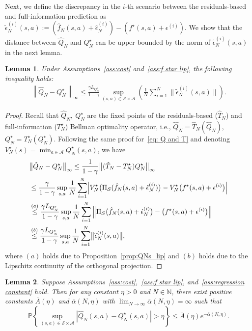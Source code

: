 \documentclass[letterpaper, 10 pt, conference]{ieeeconf}  %
\newtheorem{lemma}{Lemma}
\begin{document}
Next, we define the discrepancy in the $i$-th scenario between the residuals-based and full-information prediction as $\widetilde{\epsilon}_N^{(i)}(s,a):=(\hat f_N(s,a)+\hat\epsilon_N^{(i)}) - (f^\star(s,a) + \epsilon^{(i)})$. We show that the distance between $\hat{Q}_N$ and $Q_N^\star$ can be upper bounded by the norm of $\widetilde{\epsilon}_N^{(i)}(s,a)$ in the next lemma.
\begin{lemma}\label{lemma: hatQ_N - Q_N^*} Under Assumptions\ \ref{ass:cost} and\ \ref{ass:f star lip}, the following inequality holds:
\begin{align}
\left\|\hat{Q}_N - Q_N^\star\right\|_\infty \le \frac{\gamma L_{Q_N^\star}}{1-\gamma}   \sup_{(s,a) \in \mathcal S \times \mathcal A}\left(\frac{1}{N} \sum_{i=1}^N \|\widetilde{\epsilon}_N^{(i)}(s,a)\|\right).
\end{align}
\end{lemma}
\begin{proof}
Recall that $\hat{Q}_N,\ Q^\star_N$ are the fixed points of the residuals-based ($\hat{T}_N$) and full-information ($T^\star_N$) Bellman optimality operator, i.e., $\hat{Q}_N = \hat{T}_N(\hat{Q}_N)$, $Q^\star_N = T_N^\star(Q^\star_N)$. Following the same proof for\ \eqref{eq: Q and T} and denoting $V_N^\star(s)=\min_{a\in\mathcal A}Q_N^\star(s,a)$, we have
\allowdisplaybreaks
\footnotesize
\begin{align}
&\bigl\|\hat{Q}_N-Q_N^\star\bigr\|_\infty
\le \frac{1}{1-\gamma}
\bigl\|(\hat{T}_N-T_N^\star)Q_N^\star\bigr\|_\infty\nonumber\\
&\le \frac{\gamma}{1-\gamma}
\sup_{s,a}
\frac{1}{N}\sum_{i=1}^N
\Bigl|V_N^\star\bigl(\Pi_{\mathcal S}(\hat f_N(s,a)+\hat\epsilon_N^{(i)})\bigr)
-V_N^\star\bigl(f^\star(s,a)+\epsilon^{(i)}\bigr)
\Bigr| \nonumber\\
&\overset{(a)}{\le} \frac{\gamma L_{Q_N^\star}}{1-\gamma}
\sup_{s,a}
\frac{1}{N}\sum_{i=1}^N
\left\|
\Pi_{\mathcal S}\bigl(\hat{f}_N(s,a)+\hat{\epsilon}_N^{(i)}\bigr)
-
\bigl(f^\star(s,a)+\epsilon^{(i)}\bigr)
\right\|\nonumber\\
&\overset{(b)}{\le} \frac{\gamma L_{Q_N^\star}}{1-\gamma}
\sup_{s,a}
\frac{1}{N}\sum_{i=1}^N
\bigl\|\widetilde{\epsilon}_N^{(i)}(s,a)\bigr\|,
\label{eq:q-bound}
\end{align}
\normalsize
where $(a)$ holds due to Proposition\ \ref{prop:QNs_lip} and $(b)$ holds due to the Lipschitz continuity of the orthogonal projection.
\end{proof}
\begin{lemma}\label{lemma:finite sample lemma}
Suppose Assumptions\ \ref{ass:cost},\ \ref{ass:f star lip}, and\ \ref{ass:regression constant} hold. Then for any constant $\eta>0$ and $N \in \mathbb N$, there exist positive constants $\bar{A}(\eta)$ and $\bar{\alpha}(N,\eta)$ with $\lim_{N \rightarrow \infty} \bar{\alpha}(N,\eta) = \infty$ such that 
$$\mathbb P\left\{\sup_{(s,a) \in \mathcal S \times \mathcal A} |\hat{Q}_N(s,a) - Q_N^\star(s,a)| >\eta\right\} \le \bar{A}(\eta) e^{-\bar{\alpha}(N,\eta)}.$$
\end{lemma}
\end{document}
